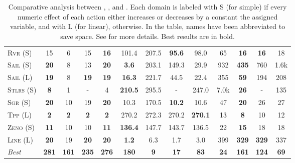 \documentclass[11pt]{article}
\begin{document}
\begin{table*}[tb]
{\begin{tabular}{|l||cccc||cccc||cccc||}
\textsc{Rvr} (S)&15&6&15&\textbf{16}&101.4&207.5&\textbf{95.6}&98.0&65&\textbf{16}&\textbf{16}&18\\
\textsc{Sail} (S)&\textbf{20}&8&13&\textbf{20}&\textbf{3.6}&203.1&149.3&29.9&932&\textbf{435}&760&1.6k\\
\textsc{Sail} (L)&\textbf{19}&8&\textbf{19}&\textbf{19}&\textbf{16.3}&221.7&44.5&22.4&355&\textbf{59}&194&208\\
\textsc{Stlrs} (S)&\textbf{8}&1&-&4&\textbf{210.5}&295.5&-&247.0&7.0k&\textbf{26}&-&135\\
\textsc{Sgr} (S)&\textbf{20}&10&19&\textbf{20}&10.3&170.5&\textbf{10.2}&10.6&47&\textbf{20}&26&27\\
\textsc{Tpp} (L)&\textbf{2}&\textbf{2}&\textbf{2}&\textbf{2}&270.2&272.3&270.2&\textbf{270.1}&13&\textbf{8}&10&12\\
\textsc{Zeno} (S)&\textbf{11}&10&10&\textbf{11}&\textbf{136.4}&147.7&143.7&136.5&22&\textbf{15}&18&18\\
\textsc{Line} (L)&\textbf{20}&19&\textbf{20}&\textbf{20}&\textbf{1.2}&6.3&1.7&3.0&399&\textbf{329}&\textbf{329}&337
\\\hline
\textit{Best}&\textbf{281}&\textbf{161}&\textbf{235}&\textbf{276}&\textbf{180}&\textbf{9}&\textbf{17}&\textbf{83}&\textbf{24}&\textbf{161}&\textbf{124}&\textbf{69}\\\hline

        \end{tabular}}
        \caption{Comparative analysis between  \pattye, \pattym, \pattyi and \pattyc. Each domain is labeled with S (for simple) if every numeric effect of each action either increases or decreases by a constant the assigned variable, and with L (for linear), otherwise. In the table, names have been abbreviated to save space.  See \cite{ipc2023} for more details. Best results are in bold.}
        \label{tab:qual-plans}
        \end{table*}
        
\end{document}
